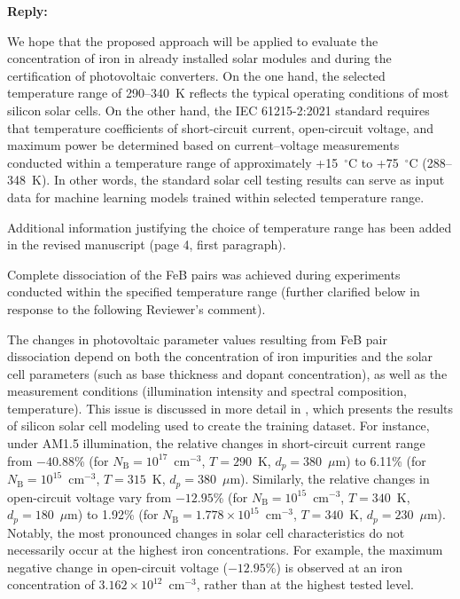 \documentclass[a4paper,fleqn]{cas-sc}
\begin{document}
\noindent
\textcolor[rgb]{0.51,0.00,0.00}{\textbf{Reply:}}

We hope that the proposed approach will be applied to evaluate the concentration of iron in already installed solar modules
and during the certification of photovoltaic converters.
On the one hand, the selected temperature range of 290–340~K reflects the typical operating conditions of most silicon solar cells.
On the other hand, the IEC 61215-2:2021 \cite{IEC61215} standard requires that temperature coefficients of
short-circuit current, open-circuit voltage, and maximum power be determined based on current–voltage measurements conducted
within a temperature range of approximately +15~$^\circ$C to +75~$^\circ$C (288–348~K).
In other words, the standard solar cell testing results can serve as input data for machine learning models trained within selected temperature range.

Additional information justifying the choice of temperature range has been added in the revised manuscript (page 4, first paragraph).


Complete dissociation of the FeB pairs was achieved during experiments conducted within the specified temperature range
(further clarified below in response to the following Reviewer's comment).


The changes in photovoltaic parameter values resulting from FeB pair dissociation depend on
both the concentration of iron impurities and the solar cell parameters
(such as base thickness and dopant concentration),
as well as the measurement conditions (illumination intensity and spectral composition, temperature).
This issue is discussed in more detail in \cite{Olikh2025MSEB},
which presents the results of silicon solar cell modeling used to create the training dataset.
For instance, under AM1.5 illumination, the relative changes in short-circuit current range
from $-40.88$\%
(for $N_\mathrm{B}=10^{17}$~cm$^{-3}$, $T=290$~K, $d_p=380$~$\mu$m)
to 6.11\%
(for $N_\mathrm{B}=10^{15}$~cm$^{-3}$, $T=315$~K, $d_p=380$~$\mu$m).
Similarly, the relative changes in open-circuit voltage vary from
$-12.95$\%
(for $N_\mathrm{B}=10^{15}$~cm$^{-3}$, $T=340$~K, $d_p=180$~$\mu$m)
to 1.92\%
(for $N_\mathrm{B}=1.778\times10^{15}$~cm$^{-3}$, $T=340$~K, $d_p=230$~$\mu$m).
Notably, the most pronounced changes in solar cell characteristics do not necessarily occur at the highest iron concentrations.
For example, the maximum negative change in open-circuit voltage ($-12.95$\%)
is observed at an iron concentration of $3.162\times10^{12}$~cm$^{-3}$,
rather than at the highest tested level.
\end{document}
